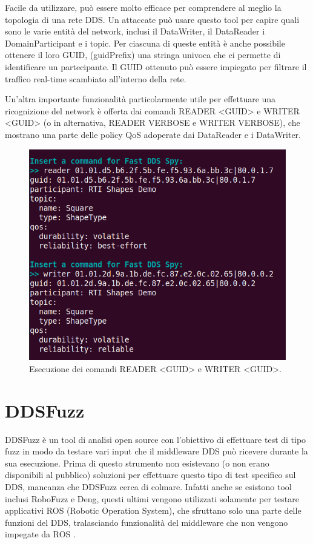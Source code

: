 Facile da utilizzare, può essere molto efficace per comprendere 
al meglio la topologia di una rete DDS. Un attaccate può usare questo 
tool per capire quali sono le varie entità del network, 
inclusi il DataWriter, il DataReader i DomainParticipant e i topic.
Per ciascuna di queste entità è anche possibile ottenere 
il loro GUID, (guidPrefix)
una stringa univoca che ci permette di identificare un partecipante.
Il GUID ottenuto può essere impiegato 
per filtrare il traffico 
real-time scambiato
all'interno della rete.

Un'altra importante funzionalità particolarmente utile per effettuare
una ricognizione del
network è offerta dai
comandi READER <GUID> e WRITER <GUID> (o in alternativa,
READER VERBOSE e WRITER VERBOSE), che mostrano
una parte delle policy QoS adoperate dai DataReader e i DataWriter.

\begin{figure}[H]
    \centering
    \includegraphics[width=12cm, keepaspectratio]{img/fastddsspyQoS.png}
    \caption{Esecuzione dei comandi READER <GUID> e WRITER <GUID>.}
    \label{fastddsspyQoS}
\end{figure}

\section{DDSFuzz}
DDSFuzz è un tool di analisi open source con l'obiettivo di 
effettuare test di tipo fuzz
in modo da testare vari input che il middleware DDS può
ricevere durante la sua esecuzione. Prima di questo strumento 
non esistevano (o non erano disponibili al pubblico) soluzioni
per effettuare questo tipo di test specifico sul DDS, mancanza
che DDSFuzz cerca di colmare. Infatti anche se esistono tool 
inclusi RoboFuzz e Deng, questi ultimi vengono utilizzati solamente
per testare applicativi ROS (Robotic Operation System), che 
sfruttano solo una parte delle funzioni del DDS, tralasciando
funzionalità del middleware che non vengono impegate
da ROS \cite{10.1145/3691620.3695073}.\label{ddsfuzz}

